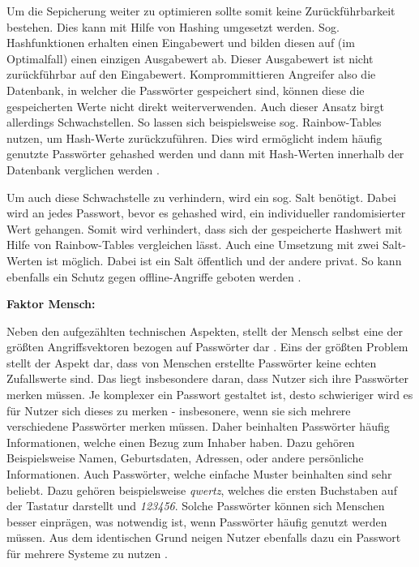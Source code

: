     Um die Sepicherung weiter zu optimieren sollte somit keine Zurückführbarkeit bestehen. Dies kann mit Hilfe von Hashing umgesetzt werden. Sog. Hashfunktionen erhalten einen Eingabewert und bilden diesen auf (im Optimalfall) einen einzigen Ausgabewert ab. Dieser Ausgabewert ist nicht zurückführbar auf den Eingabewert. Komprommittieren Angreifer also die Datenbank, in welcher die Passwörter gespeichert sind, können diese die gespeicherten Werte nicht direkt weiterverwenden. Auch dieser Ansatz birgt allerdings Schwachstellen. So lassen sich beispielsweise sog. Rainbow-Tables nutzen, um Hash-Werte zurückzuführen. Dies wird ermöglicht indem häufig genutzte Passwörter gehashed werden und dann mit Hash-Werten innerhalb der Datenbank verglichen werden \cite{chanda2016password}. 

    Um auch diese Schwachstelle zu verhindern, wird ein sog. Salt benötigt. Dabei wird an jedes Passwort, bevor es gehashed wird, ein individueller randomisierter Wert gehangen. Somit wird verhindert, dass sich der gespeicherte Hashwert mit Hilfe von Rainbow-Tables vergleichen lässt. Auch eine Umsetzung mit zwei Salt-Werten ist möglich. Dabei ist ein Salt öffentlich und der andere privat. So kann ebenfalls ein Schutz gegen offline-Angriffe geboten werden \cite{chanda2016password}.

\textbf{Faktor Mensch:}

Neben den aufgezählten technischen Aspekten, stellt der Mensch selbst eine der größten Angriffsvektoren bezogen auf Passwörter dar \cite{ives2004domino} \cite{yildirim2019encouraging}. Eins der größten Problem stellt der Aspekt dar, dass von Menschen erstellte Passwörter keine echten Zufallswerte sind. Das liegt insbesondere daran, dass Nutzer sich ihre Passwörter merken müssen. Je komplexer ein Passwort gestaltet ist, desto schwieriger wird es für Nutzer sich dieses zu merken - insbesonere, wenn sie sich mehrere verschiedene Passwörter merken müssen. Daher beinhalten Passwörter häufig Informationen, welche einen Bezug zum Inhaber haben. Dazu gehören Beispielsweise Namen, Geburtsdaten, Adressen, oder andere persönliche Informationen. Auch Passwörter, welche einfache Muster beinhalten sind sehr beliebt. Dazu gehören beispielsweise \textit{qwertz}, welches die ersten Buchstaben auf der Tastatur darstellt und \textit{123456}. Solche Passwörter können sich Menschen besser einprägen, was notwendig ist, wenn Passwörter häufig genutzt werden müssen. Aus dem identischen Grund neigen Nutzer ebenfalls dazu ein Passwort für mehrere Systeme zu nutzen \cite{chanda2016password} \cite{boonkrong2012security} \cite{yildirim2019encouraging}. 

